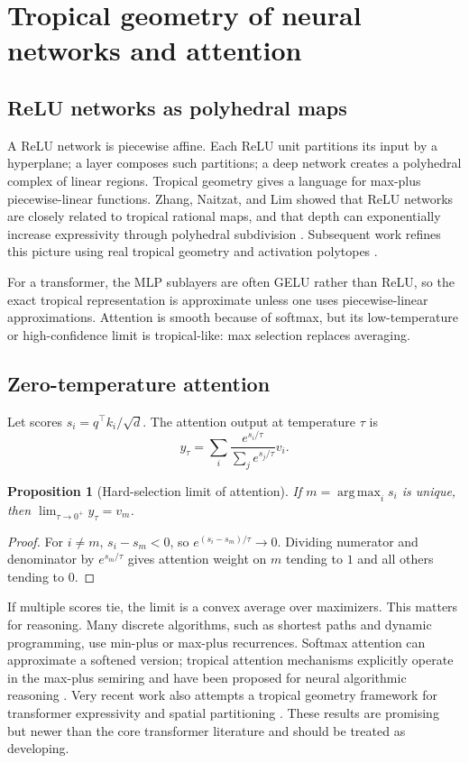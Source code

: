 \documentclass[11pt]{article}
\newtheorem{proposition}[definition]{Proposition}
\newcommand{\argmax}{\operatorname*{arg\,max}}
\newcommand{\1}{\mathbf{1}}
\begin{document}
\section{Tropical geometry of neural networks and attention}

\subsection{ReLU networks as polyhedral maps}

A ReLU network is piecewise affine. Each ReLU unit partitions its input by a hyperplane; a layer composes such partitions; a deep network creates a polyhedral complex of linear regions. Tropical geometry gives a language for max-plus piecewise-linear functions. Zhang, Naitzat, and Lim showed that ReLU networks are closely related to tropical rational maps, and that depth can exponentially increase expressivity through polyhedral subdivision \cite{ZhangTropical2018}. Subsequent work refines this picture using real tropical geometry and activation polytopes \cite{Brandenburg2024}.

For a transformer, the MLP sublayers are often GELU rather than ReLU, so the exact tropical representation is approximate unless one uses piecewise-linear approximations. Attention is smooth because of softmax, but its low-temperature or high-confidence limit is tropical-like: max selection replaces averaging.

\subsection{Zero-temperature attention}

Let scores $s_i=q^\top k_i/\sqrt d$. The attention output at temperature $\tau$ is
\[
y_\tau=\sum_i \frac{e^{s_i/\tau}}{\sum_j e^{s_j/\tau}}v_i.
\]

\begin{proposition}[Hard-selection limit of attention]
If $m=\argmax_i s_i$ is unique, then $\lim_{\tau\to0^+}y_\tau=v_m$.
\end{proposition}
\begin{proof}
For $i\ne m$, $s_i-s_m<0$, so $e^{(s_i-s_m)/\tau}\to0$. Dividing numerator and denominator by $e^{s_m/\tau}$ gives attention weight on $m$ tending to $1$ and all others tending to $0$.
\end{proof}

If multiple scores tie, the limit is a convex average over maximizers. This matters for reasoning. Many discrete algorithms, such as shortest paths and dynamic programming, use min-plus or max-plus recurrences. Softmax attention can approximate a softened version; tropical attention mechanisms explicitly operate in the max-plus semiring and have been proposed for neural algorithmic reasoning \cite{HashemiTropicalAttention2025}. Very recent work also attempts a tropical geometry framework for transformer expressivity and spatial partitioning \cite{TransformerTropical2026}. These results are promising but newer than the core transformer literature and should be treated as developing.
\end{document}

